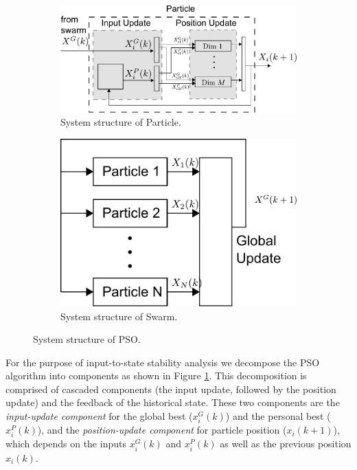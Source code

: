 \documentclass[phd]{byuprop}
\begin{document}
\begin{figure}[htbp]
	\centering
	\begin{subfigure}[t]{0.6\linewidth}
		\centering
		\includegraphics[width=\textwidth]{fig/particle_sys_flow.pdf}
		\caption{System structure of Particle.}
		\label{fig:sys:particle}
	\end{subfigure}  
	\begin{subfigure}[t]{0.37\linewidth}
		\centering
		\includegraphics[width=\textwidth]{fig/pso_sys_flow.pdf}
		\caption{System structure of Swarm.}
		\label{fig:sys:swarm}
	\end{subfigure}   
	\caption{System structure of PSO.}
	\label{fig:sys:pso}
\end{figure}

For the purpose of input-to-state stability analysis we decompose the PSO algorithm into components as shown in Figure \ref{fig:sys:particle}. 
This decomposition is comprised of cascaded components (the input update, followed by the position update) and the feedback of the historical state.
These two components are the 
\emph{input-update component} for the global best ($ x^{G}_{i}(k) $) and the personal best ($ x^{P}_{i}(k) $), and the 
\emph{position-update component} for particle position ($ x_{i}(k+1) $), which depends on the inputs $ x^{G}_{i}(k) $ and $ x^{P}_{i}(k) $ as well as the previous position $ x_{i}(k) $.
\end{document}
